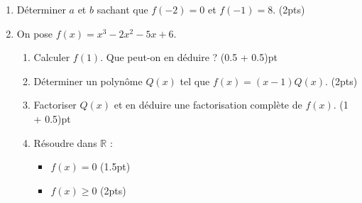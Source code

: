 \documentclass[12pt,a4paper]{article}
\begin{document}
\begin{enumerate}
    \item Déterminer \( a \) et \( b \) sachant que \( f(-2) = 0 \) et \( f(-1) = 8 \). \hfill (2pts)
    \item On pose \( f(x) = x^3 - 2x^2 - 5x + 6 \).
        \begin{enumerate}
            \item Calculer \( f(1) \). Que peut-on en déduire ? \hfill (0.5 + 0.5)pt
            \item Déterminer un polynôme \( Q(x) \) tel que \( f(x) = (x - 1)Q(x) \). \hfill (2pts)
            \item Factoriser \( Q(x) \) et en déduire une factorisation complète de \( f(x) \). \hfill (1 + 0.5)pt
            \item Résoudre dans \( \mathbb{R} \) :
            \begin{itemize}
                \item \( f(x) = 0 \) \hfill (1.5pt)
                \item \( f(x) \geq 0 \) \hfill (2pts)
            \end{itemize}
        \end{enumerate}
\end{enumerate}
\end{document}
